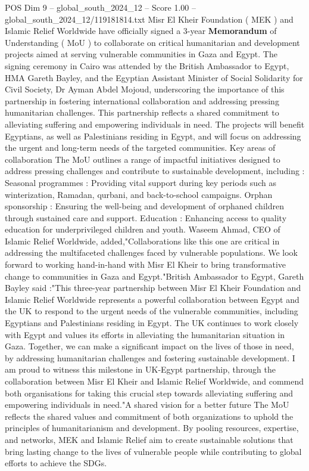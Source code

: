 \begin{textsample}{POS Dim 9 – global\_south\_2024\_12 – Score 1.00 – global\_south\_2024\_12/119181814.txt}  \label{ex:f9_pos_228}
Misr El Kheir Foundation ( MEK ) and Islamic Relief Worldwide have officially signed a 3-year \textbf{Memorandum} of Understanding ( MoU ) to collaborate on critical humanitarian and development projects aimed at serving vulnerable communities in Gaza and Egypt.
The signing ceremony in Cairo was attended by the British Ambassador to Egypt, HMA Gareth Bayley, and the Egyptian Assistant Minister of Social Solidarity for Civil Society, Dr Ayman Abdel Mojoud, underscoring the importance of this partnership in fostering international collaboration and addressing pressing humanitarian challenges.
This partnership reflects a shared commitment to alleviating suffering and empowering individuals in need.
The projects will benefit Egyptians, as well as Palestinians residing in Egypt, and will focus on addressing the urgent and long-term needs of the targeted communities.
Key areas of collaboration The MoU outlines a range of impactful initiatives designed to address pressing challenges and contribute to sustainable development, including : Seasonal programmes : Providing vital support during key periods such as winterization, Ramadan, qurbani, and back-to-school campaigns.
Orphan sponsorship : Ensuring the well-being and development of orphaned children through sustained care and support.
Education : Enhancing access to quality education for underprivileged children and youth.
Waseem Ahmad, CEO of Islamic Relief Worldwide, added,"Collaborations like this one are critical in addressing the multifaceted challenges faced by vulnerable populations.
We look forward to working hand-in-hand with Misr El Kheir to bring transformative change to communities in Gaza and Egypt."British Ambassador to Egypt, Gareth Bayley said :"This three-year partnership between Misr El Kheir Foundation and Islamic Relief Worldwide represents a powerful collaboration between Egypt and the UK to respond to the urgent needs of the vulnerable communities, including Egyptians and Palestinians residing in Egypt.
The UK continues to work closely with Egypt and values its efforts in alleviating the humanitarian situation in Gaza.
Together, we can make a significant impact on the lives of those in need, by addressing humanitarian challenges and fostering sustainable development.
I am proud to witness this milestone in UK-Egypt partnership, through the collaboration between Misr El Kheir and Islamic Relief Worldwide, and commend both organisations for taking this crucial step towards alleviating suffering and empowering individuals in need."A shared vision for a better future The MoU reflects the shared values and commitment of both organizations to uphold the principles of humanitarianism and development.
By pooling resources, expertise, and networks, MEK and Islamic Relief aim to create sustainable solutions that bring lasting change to the lives of vulnerable people while contributing to global efforts to achieve the SDGs.

\end{textsample}
